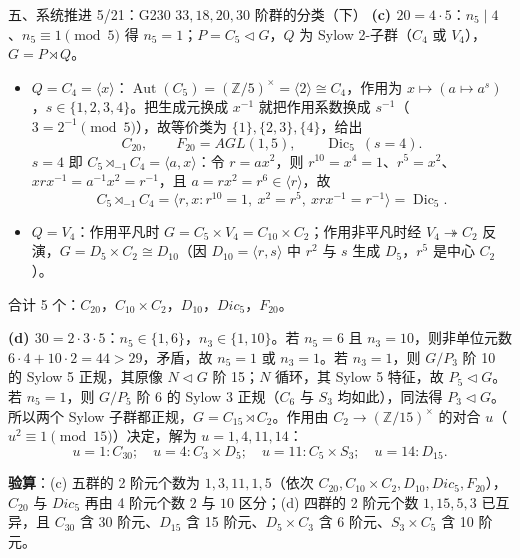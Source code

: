 \documentclass[aspectratio=169,10pt,fontset=none]{ctexbeamer}
\newcommand{\key}[1]{\textcolor{ink}{\bfseries #1}}
\begin{document}
\begin{frame}[t]{五、系统推进 5/21：G230 $33,18,20,30$ 阶群的分类（下）}
\scriptsize
\key{(c) $20=4\cdot5$}：$n_5\mid4$、$n_5\equiv1\pmod5$ 得 $n_5=1$；$P=C_5\triangleleft G$，$Q$ 为 Sylow 2-子群（$C_4$ 或 $V_4$），$G=P\rtimes Q$。
\begin{itemize}
\item $Q=C_4=\langle x\rangle$：$\operatorname{Aut}(C_5)=(\mathbb Z/5)^\times=\langle2\rangle\cong C_4$，作用为 $x\mapsto(a\mapsto a^s)$，$s\in\{1,2,3,4\}$。把生成元换成 $x^{-1}$ 就把作用系数换成 $s^{-1}$（$3=2^{-1}\pmod5$），故等价类为 $\{1\},\{2,3\},\{4\}$，给出
\[ C_{20},\qquad F_{20}=AGL(1,5),\qquad \operatorname{Dic}_5\ (s=4). \]
$s=4$ 即 $C_5\rtimes_{-1}C_4=\langle a,x\rangle$：令 $r=ax^2$，则 $r^{10}=x^{4}=1$、$r^5=x^2$、$xrx^{-1}=a^{-1}x^2=r^{-1}$，且 $a=rx^2=r^6\in\langle r\rangle$，故
\[ C_5\rtimes_{-1}C_4=\langle r,x:r^{10}=1,\ x^2=r^5,\ xrx^{-1}=r^{-1}\rangle=\operatorname{Dic}_5. \]
\item $Q=V_4$：作用平凡时 $G=C_5\times V_4=C_{10}\times C_2$；作用非平凡时经 $V_4\twoheadrightarrow C_2$ 反演，$G=D_5\times C_2\cong D_{10}$（因 $D_{10}=\langle r,s\rangle$ 中 $r^2$ 与 $s$ 生成 $D_5$，$r^5$ 是中心 $C_2$）。
\end{itemize}
合计 5 个：$C_{20}$，$C_{10}\times C_2$，$D_{10}$，$Dic_5$，$F_{20}$。

\key{(d) $30=2\cdot3\cdot5$}：$n_5\in\{1,6\}$，$n_3\in\{1,10\}$。若 $n_5=6$ 且 $n_3=10$，则非单位元数 $6\cdot4+10\cdot2=44>29$，矛盾，故 $n_5=1$ 或 $n_3=1$。若 $n_3=1$，则 $G/P_3$ 阶 10 的 Sylow 5 正规，其原像 $N\triangleleft G$ 阶 15；$N$ 循环，其 Sylow 5 特征，故 $P_5\triangleleft G$。若 $n_5=1$，则 $G/P_5$ 阶 6 的 Sylow 3 正规（$C_6$ 与 $S_3$ 均如此），同法得 $P_3\triangleleft G$。所以两个 Sylow 子群都正规，$G=C_{15}\rtimes C_2$。作用由 $C_2\to(\mathbb Z/15)^\times$ 的对合 $u$（$u^2\equiv1\pmod{15}$）决定，解为 $u=1,4,11,14$：
\[ u=1:C_{30};\quad u=4:C_3\times D_5;\quad u=11:C_5\times S_3;\quad u=14:D_{15}. \]

\key{验算}：(c) 五群的 2 阶元个数为 $1,3,11,1,5$（依次 $C_{20},C_{10}\times C_2,D_{10},Dic_5,F_{20}$），$C_{20}$ 与 $Dic_5$ 再由 4 阶元个数 $2$ 与 $10$ 区分；(d) 四群的 2 阶元个数 $1,15,5,3$ 已互异，且 $C_{30}$ 含 30 阶元、$D_{15}$ 含 15 阶元、$D_5\times C_3$ 含 6 阶元、$S_3\times C_5$ 含 10 阶元。
\end{frame}
\end{document}
